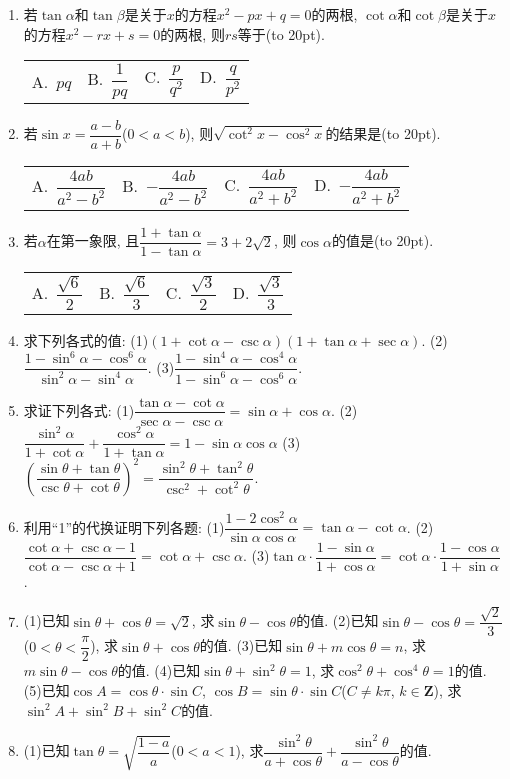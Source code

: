 \documentclass[10pt,a4paper]{article}
\newcommand{\blank}[1]{\underline{\hbox to #1pt{}}}
\newcommand{\bracket}[1]{(\hbox to #1pt{})}
\newcommand{\fourch}[4]{\par\begin{tabular}{p{.23\textwidth}p{.23\textwidth}p{.23\textwidth}p{.23\textwidth}}
A.~#1 &B.~#2& C.~#3& D.~#4
\end{tabular}}
\begin{document}
\begin{enumerate}[1.]
(3)若$(\sin \alpha +\cos \alpha)^2=\dfrac 85$, 则$\tan \alpha =$\blank{50}.
\item 若$\tan \alpha$和$\tan \beta$是关于$x$的方程$x^2-px+q=0$的两根, $\cot \alpha$和$\cot \beta$是关于$x$的方程$x^2-rx+s=0$的两根, 则$rs$等于\bracket{20}.
\fourch{$pq$}{$\dfrac 1{pq}$}{$\dfrac p{q^2}$}{$\dfrac q{p^2}$}
\item 若$\sin x=\dfrac{a-b}{a+b}$($0<a<b$), 则$\sqrt {\cot ^2x-\cos ^2x}$的结果是\bracket{20}.
\fourch{$\dfrac{4ab}{a^2-b^2}$}{$-\dfrac{4ab}{a^2-b^2}$}{$\dfrac{4ab}{a^2+b^2}$}{$-\dfrac{4ab}{a^2+b^2}$}
\item 若$\alpha$在第一象限, 且$\dfrac{1+\tan \alpha }{1-\tan \alpha }=3+2\sqrt 2$, 则$\cos \alpha$的值是\bracket{20}.
\fourch{$\dfrac{\sqrt 6}2$}{$\dfrac{\sqrt 6}3$}{$\dfrac{\sqrt 3}2$}{$\dfrac{\sqrt 3}3$}
\item 求下列各式的值:
(1)$(1+\cot \alpha -\csc \alpha)(1+\tan \alpha +\sec \alpha)$.		(2)$\dfrac{1-\sin ^6\alpha -\cos ^6\alpha }{\sin ^2\alpha -\sin ^4\alpha }$.
(3)$\dfrac{1-\sin ^4\alpha -\cos ^4\alpha }{1-\sin ^6\alpha -\cos ^6\alpha }$.
\item 求证下列各式:
(1)$\dfrac{\tan \alpha -\cot \alpha }{\sec \alpha -\csc \alpha }=\sin \alpha +\cos \alpha$.		(2)$\dfrac{\sin ^2\alpha }{1+\cot \alpha }+\dfrac{\cos ^2\alpha }{1+\tan \alpha }=1-\sin \alpha \cos \alpha$
(3)$(\dfrac{\sin \theta +\tan \theta }{\csc \theta +\cot \theta })^2=\dfrac{\sin ^2\theta +\tan ^2\theta }{\csc ^2+\cot ^2\theta }$.
\item 利用``1''的代换证明下列各题:
(1)$\dfrac{1-2\cos ^2\alpha }{\sin \alpha \cos \alpha }=\tan \alpha -\cot \alpha$.			(2)$\dfrac{\cot \alpha +\csc \alpha -1}{\cot \alpha -\csc \alpha +1}=\cot \alpha +\csc \alpha$.
(3)$\tan \alpha \cdot \dfrac{1-\sin \alpha }{1+\cos \alpha }=\cot \alpha \cdot \dfrac{1-\cos \alpha }{1+\sin \alpha }$.
\item (1)已知$\sin \theta +\cos \theta =\sqrt 2$, 求$\sin \theta -\cos \theta$的值.
(2)已知$\sin \theta -\cos \theta =\dfrac{\sqrt 2}3$($0<\theta <\dfrac{\pi }2$), 求$\sin \theta +\cos \theta$的值.
(3)已知$\sin \theta +m\cos \theta =n$, 求$m\sin \theta -\cos \theta$的值.
(4)已知$\sin \theta +\sin ^2\theta =1$, 求$\cos ^2\theta +\cos ^4\theta =1$的值.
(5)已知$\cos A=\cos \theta \cdot \sin C$, $\cos B=\sin \theta \cdot \sin C$($C\ne k\pi$, $k\in \mathbf{Z}$), 求$\sin ^2A+\sin ^2B+\sin ^2C$的值.
\item (1)已知$\tan \theta =\sqrt {\dfrac{1-a}a}$($0<a<1$), 求$\dfrac{\sin ^2\theta }{a+\cos \theta }+\dfrac{\sin ^2\theta }{a-\cos \theta }$的值.

\end{enumerate}
\end{document}
